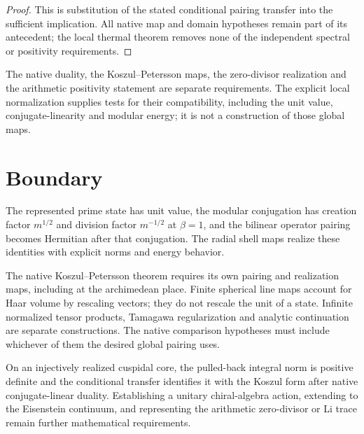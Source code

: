 \begin{proof}
This is substitution of the stated conditional pairing transfer into
the sufficient implication. All native map and domain hypotheses remain
part of its antecedent; the local thermal theorem removes none of the
independent spectral or positivity requirements.
\end{proof}

\begin{remark}
\label{v4-arith:kp:rem:substantial-reestimate}
The native duality, the Koszul--Petersson maps, the zero-divisor
realization and the arithmetic positivity statement are separate
requirements. The explicit local normalization supplies tests for their
compatibility, including the unit value, conjugate-linearity and modular
energy; it is not a construction of those global maps.
\end{remark}

\section{Boundary}
\label{v4-arith:kp:summary}

The represented prime state has unit value, the modular conjugation has
creation factor \(m^{1/2}\) and division factor \(m^{-1/2}\) at
\(\beta=1\), and the bilinear operator pairing becomes Hermitian after
that conjugation. The radial shell maps realize these identities with
explicit norms and energy behavior.

The native Koszul--Petersson theorem requires its own pairing and
realization maps, including at the archimedean place. Finite spherical
line maps account for Haar volume by rescaling vectors; they do not
rescale the unit of a state. Infinite normalized tensor products,
Tamagawa regularization and analytic continuation are separate
constructions. The native comparison hypotheses must include whichever
of them the desired global pairing uses.

On an injectively realized cuspidal core, the pulled-back integral norm
is positive definite and the conditional transfer identifies it with
the Koszul form after native conjugate-linear duality. Establishing a
unitary chiral-algebra action, extending to the Eisenstein continuum,
and representing the arithmetic zero-divisor or Li trace remain further
mathematical requirements.
